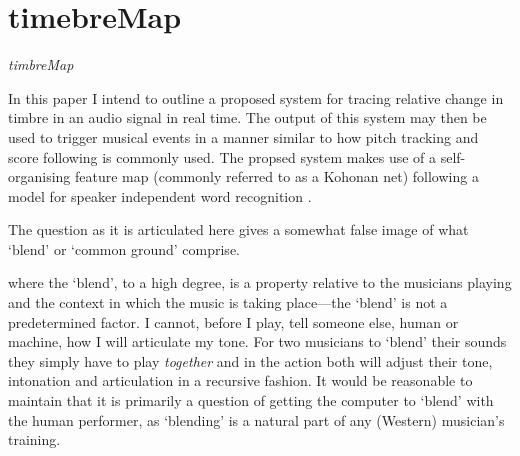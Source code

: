 \section{timebreMap}
\label{sec:timebremap}

\emph{timbreMap}

In this paper I intend to outline a proposed system for tracing relative change in timbre in an audio signal in real time. The output of this system may then be used to trigger musical events in a manner similar to how pitch tracking and score following is commonly used. The propsed system makes use of a self-organising feature map (commonly referred to as a Kohonan net) following a model for speaker independent word recognition \cite{huang92}.


The question as it is articulated here gives a somewhat false image of what `blend' or `common ground' comprise. 

where the `blend', to a high degree, is a property relative to the musicians playing and the context in which the music is taking place---the `blend' is not a predetermined factor. I cannot, before I play, tell someone else, human or machine, how I will articulate my tone. For two musicians to `blend' their sounds they simply have to play \emph{together} and in the action both will adjust their tone, intonation and articulation in a recursive fashion. It would be reasonable to maintain that it is primarily a question of getting the computer to `blend' with the human performer, as `blending' is a natural part of any (Western) musician's training. 


